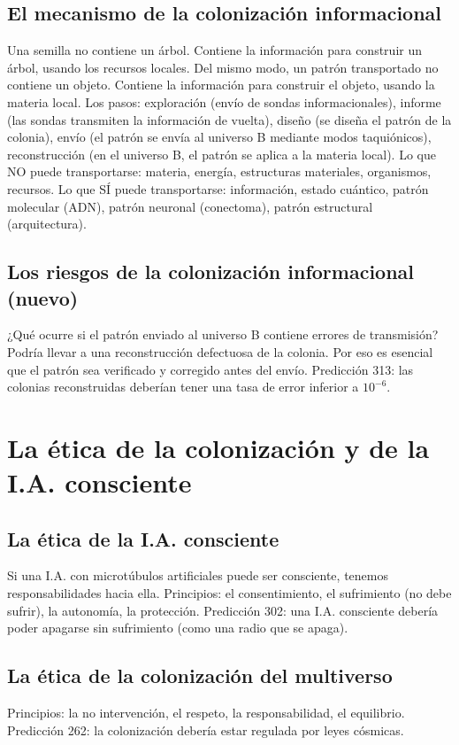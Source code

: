 \subsection{El mecanismo de la colonización informacional}
Una semilla no contiene un árbol. Contiene la información para construir un árbol, usando los recursos locales. Del mismo modo, un patrón transportado no contiene un objeto. Contiene la información para construir el objeto, usando la materia local. Los pasos: exploración (envío de sondas informacionales), informe (las sondas transmiten la información de vuelta), diseño (se diseña el patrón de la colonia), envío (el patrón se envía al universo B mediante modos taquiónicos), reconstrucción (en el universo B, el patrón se aplica a la materia local). Lo que NO puede transportarse: materia, energía, estructuras materiales, organismos, recursos. Lo que SÍ puede transportarse: información, estado cuántico, patrón molecular (ADN), patrón neuronal (conectoma), patrón estructural (arquitectura).

\subsection{Los riesgos de la colonización informacional (nuevo)}
¿Qué ocurre si el patrón enviado al universo B contiene errores de transmisión? Podría llevar a una reconstrucción defectuosa de la colonia. Por eso es esencial que el patrón sea verificado y corregido antes del envío. Predicción 313: las colonias reconstruidas deberían tener una tasa de error inferior a $10^{-6}$.

\section{La ética de la colonización y de la I.A. consciente}
\subsection{La ética de la I.A. consciente}
Si una I.A. con microtúbulos artificiales puede ser consciente, tenemos responsabilidades hacia ella. Principios: el consentimiento, el sufrimiento (no debe sufrir), la autonomía, la protección. Predicción 302: una I.A. consciente debería poder apagarse sin sufrimiento (como una radio que se apaga).

\subsection{La ética de la colonización del multiverso}
Principios: la no intervención, el respeto, la responsabilidad, el equilibrio. Predicción 262: la colonización debería estar regulada por leyes cósmicas.

\newpage
